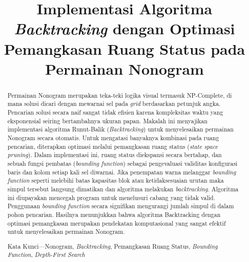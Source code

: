 \documentclass[conference]{IEEEtran}
\begin{document}
\title{\Huge {Implementasi Algoritma \textit{Backtracking} dengan Optimasi Pemangkasan Ruang Status pada Permainan Nonogram}}

\author{
}

\maketitle

\thispagestyle{fancy}

\begin{abstract}

Permainan Nonogram merupakan teka-teki logika visual termasuk NP-Complete, di mana solusi dicari dengan mewarnai sel pada \textit{grid} berdasarkan petunjuk angka. Pencarian solusi secara naif sangat tidak efisien karena kompleksitas waktu yang eksponensial seiring bertambahnya ukuran papan. Makalah ini menyajikan implementasi algoritma Runut-Balik (\textit{Backtracking}) untuk menyelesaikan permainan Nonogram secara otomatis. Untuk mengatasi banyaknya kombinasi pada ruang pencarian, diterapkan optimasi melalui pemangkasan ruang status (\textit{state space pruning}). Dalam implementasi ini, ruang status diekspansi secara bertahap, dan sebuah fungsi pembatas (\textit{bounding function}) sebagai pengevaluasi validitas konfigurasi baris dan kolom setiap kali sel diwarnai. Jika penempatan warna melanggar \textit{bounding function} seperti melebihi batas kapasitas blok atau ketidaksesuaian urutan maka simpul tersebut langsung dimatikan dan algoritma melakukan \textit{backtracking}. Algoritma ini diupayakan mencegah program untuk menelusuri cabang yang tidak valid. Penggunaan \textit{bounding function} secara signifikan mengurangi jumlah simpul di dalam pohon pencarian. Hasilnya menunjukkan bahwa algoritma Backtracking dengan optimasi pemangkasan merupakan pendekatan komputasional yang sangat efektif untuk menyelesaikan permainan Nonogram.

Kata Kunci—Nonogram, \textit{Backtracking}, Pemangkasan Ruang Status, \textit{Bounding Function}, \textit{Depth-First Search}
\end{abstract}
\end{document}
